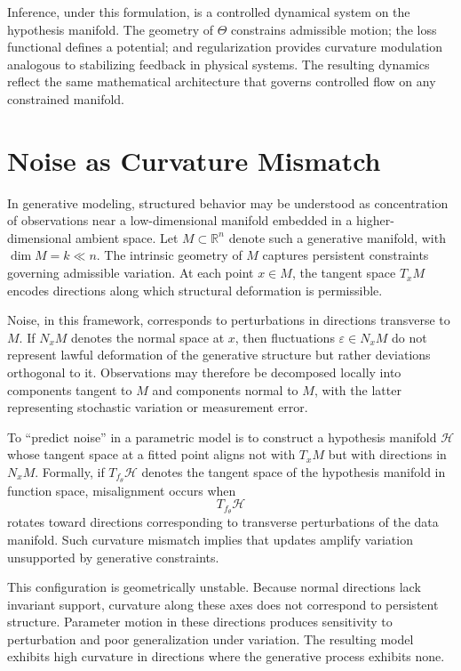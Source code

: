 \documentclass[12pt]{book}
\begin{document}
Inference, under this formulation, is a controlled dynamical system on the hypothesis manifold. The geometry of $\Theta$ constrains admissible motion; the loss functional defines a potential; and regularization provides curvature modulation analogous to stabilizing feedback in physical systems. The resulting dynamics reflect the same mathematical architecture that governs controlled flow on any constrained manifold.

\section{Noise as Curvature Mismatch}

In generative modeling, structured behavior may be understood as concentration of observations near a low-dimensional manifold embedded in a higher-dimensional ambient space. Let $M \subset \mathbb{R}^n$ denote such a generative manifold, with $\dim M = k \ll n$. The intrinsic geometry of $M$ captures persistent constraints governing admissible variation. At each point $x \in M$, the tangent space $T_x M$ encodes directions along which structural deformation is permissible.

Noise, in this framework, corresponds to perturbations in directions transverse to $M$. If $N_x M$ denotes the normal space at $x$, then fluctuations $\varepsilon \in N_x M$ do not represent lawful deformation of the generative structure but rather deviations orthogonal to it. Observations may therefore be decomposed locally into components tangent to $M$ and components normal to $M$, with the latter representing stochastic variation or measurement error.

To ``predict noise'' in a parametric model is to construct a hypothesis manifold $\mathcal{H}$ whose tangent space at a fitted point aligns not with $T_x M$ but with directions in $N_x M$. Formally, if $T_{f_\theta}\mathcal{H}$ denotes the tangent space of the hypothesis manifold in function space, misalignment occurs when
\[
T_{f_\theta}\mathcal{H}
\]
rotates toward directions corresponding to transverse perturbations of the data manifold. Such curvature mismatch implies that updates amplify variation unsupported by generative constraints.

This configuration is geometrically unstable. Because normal directions lack invariant support, curvature along these axes does not correspond to persistent structure. Parameter motion in these directions produces sensitivity to perturbation and poor generalization under variation. The resulting model exhibits high curvature in directions where the generative process exhibits none.
\end{document}
